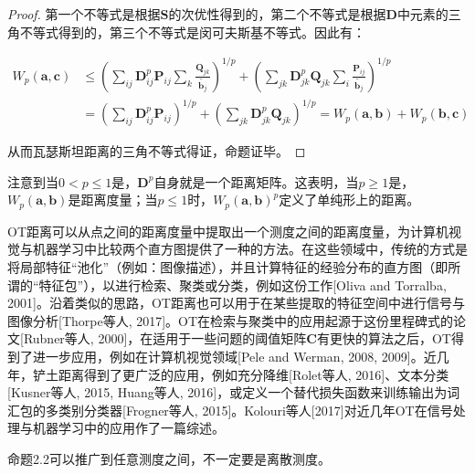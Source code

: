 \documentclass[cn,10pt,math=newtx,citestyle=gb7714-2015,bibstyle=gb7714-2015]{elegantbook}
\begin{document}
\begin{proof}
第一个不等式是根据$\mathbf{S}$的次优性得到的，第二个不等式是根据$\mathbf{D}$中元素的三角不等式得到的，第三个不等式是闵可夫斯基不等式。因此有：

\begin{align*}
    W_p(\mathbf{a,c}) &\leq \left( \sum_{ij}\mathbf{D}_{ij}^p\mathbf{P}_{ij}\sum_{k}\frac{\mathbf{Q}_{jk}}{\tilde{\mathbf{b}_j}} \right)^{1/p} + \left( \sum_{jk}\mathbf{D}_{jk}^p\mathbf{Q}_{jk}\sum_{i}\frac{\mathbf{P}_{ij}}{\tilde{\mathbf{b}_j}} \right)^{1/p}\\
    &= \left( \sum_{ij} \mathbf{D}_{ij}^p \mathbf{P}_{ij} \right)^{1/p} + \left( \sum_{jk} \mathbf{D}_{jk}^p \mathbf{Q}_{jk} \right)^{1/p}= W_p(\mathbf{a,b}) + W_p(\mathbf{b,c})
\end{align*}

从而瓦瑟斯坦距离的三角不等式得证，命题证毕。

\end{proof}

\begin{postulate}
注意到当$0<p\leq 1$是，$\mathbf{D}^p$自身就是一个距离矩阵。这表明，当$p\geq 1$是，$W_p(\mathbf{a,b})$是距离度量；当$p\leq 1$时，$W_p(\mathbf{a,b})^p$定义了单纯形上的距离。
\end{postulate}

\begin{postulate}[瓦瑟斯坦距离的应用]

OT距离可以从点之间的距离度量中提取出一个测度之间的距离度量，为计算机视觉与机器学习中比较两个直方图提供了一种的方法。在这些领域中，传统的方式是将局部特征“池化”（例如：图像描述），并且计算特征的经验分布的直方图（即所谓的“特征包”），以进行检索、聚类或分类，例如这份工作[Oliva and Torralba, 2001]。沿着类似的思路，OT距离也可以用于在某些提取的特征空间中进行信号与图像分析[Thorpe等人, 2017]。OT在检索与聚类中的应用起源于这份里程碑式的论文[Rubner等人, 2000]，在适用于一些问题的阈值矩阵$\mathbf{C}$有更快的算法之后，OT得到了进一步应用，例如在计算机视觉领域[Pele and Werman, 2008, 2009]。近几年，铲土距离得到了更广泛的应用，例如充分降维[Rolet等人, 2016]、文本分类[Kusner等人, 2015, Huang等人, 2016]，或定义一个替代损失函数来训练输出为词汇包的多类别分类器[Frogner等人, 2015]。Kolouri等人[2017]对近几年OT在信号处理与机器学习中的应用作了一篇综述。

\end{postulate}

\begin{postulate}[测度的瓦瑟斯坦距离]
命题2.2可以推广到任意测度之间，不一定要是离散测度。
\end{postulate}
\end{document}
